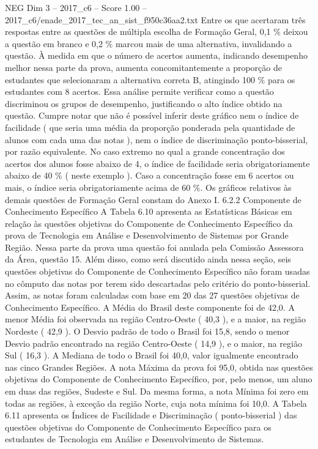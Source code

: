 \begin{textsample}{NEG Dim 3 – 2017\_c6 – Score 1.00 – 2017\_c6/enade\_2017\_tec\_an\_sist\_f950c36aa2.txt}
Entre os que acertaram três respostas entre as questões de múltipla escolha de Formação Geral, 0,1 \% deixou a questão em branco e 0,2 \% marcou mais de uma alternativa, invalidando a questão.
À medida em que o número de acertos aumenta, indicando desempenho melhor nessa parte da prova, aumenta concomitantemente a proporção de estudantes que selecionaram a alternativa correta B, atingindo 100 \% para os estudantes com 8 acertos.
Essa análise permite verificar como a questão discriminou os grupos de desempenho, justificando o alto índice obtido na questão.
Cumpre notar que não é possível inferir deste gráfico nem o índice de facilidade ( que seria uma média da proporção ponderada pela quantidade de alunos com cada uma das notas ), nem o índice de discriminação ponto-bisserial, por razão equivalente.
No caso extremo no qual a grande concentração dos acertos dos alunos fosse abaixo de 4, o índice de facilidade seria obrigatoriamente abaixo de 40 \% ( neste exemplo ).
Caso a concentração fosse em 6 acertos ou mais, o índice seria obrigatoriamente acima de 60 \%.
Os gráficos relativos às demais questões de Formação Geral constam do Anexo I. 6.2.2 Componente de Conhecimento Específico A Tabela 6.10 apresenta as Estatísticas Básicas em relação às questões objetivas do Componente de Conhecimento Específico da prova de Tecnologia em Análise e Desenvolvimento de Sistemas por Grande Região.
Nessa parte da prova uma questão foi anulada pela Comissão Assessora da Área, questão 15.
Além disso, como será discutido ainda nessa seção, seis questões objetivas do Componente de Conhecimento Específico não foram usadas no cômputo das notas por terem sido descartadas pelo critério do ponto-bisserial.
Assim, as notas foram calculadas com base em 20 das 27 questões objetivas de Conhecimento Específico.
A Média do Brasil deste componente foi de 42,0.
A menor Média foi observada na região Centro-Oeste ( 40,3 ), e a maior, na região Nordeste ( 42,9 ).
O Desvio padrão de todo o Brasil foi 15,8, sendo o menor Desvio padrão encontrado na região Centro-Oeste ( 14,9 ), e o maior, na região Sul ( 16,3 ).
A Mediana de todo o Brasil foi 40,0, valor igualmente encontrado nas cinco Grandes Regiões.
A nota Máxima da prova foi 95,0, obtida nas questões objetivas do Componente de Conhecimento Específico, por, pelo menos, um aluno em duas das regiões, Sudeste e Sul.
Da mesma forma, a nota Mínima foi zero em todas as regiões, à exceção da região Norte, cuja nota mínima foi 10,0.
A Tabela 6.11 apresenta os Índices de Facilidade e Discriminação ( ponto-bisserial ) das questões objetivas do Componente de Conhecimento Específico para os estudantes de Tecnologia em Análise e Desenvolvimento de Sistemas.

\end{textsample}
